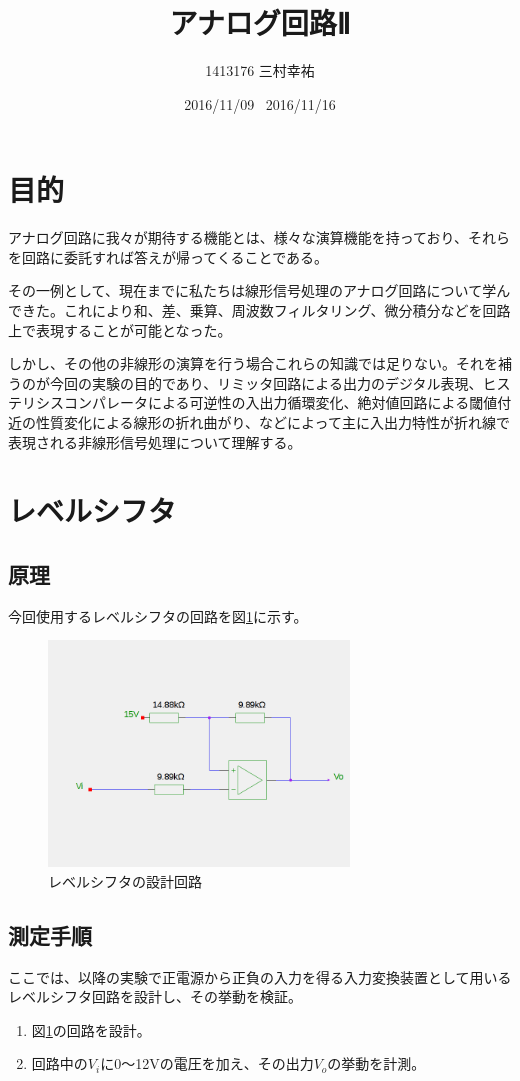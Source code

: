 \documentclass[11pt,a4j]{jsarticle}
\title{アナログ回路Ⅱ}
\author{1413176 三村幸祐}
\date{2016/11/09 \, 2016/11/16}
\begin{document}
  
 \tableofcontents \newpage
  
 \section{目的}
 アナログ回路に我々が期待する機能とは、様々な演算機能を持っており、それらを回路に委託すれば答えが帰ってくることである。
 
  その一例として、現在までに私たちは線形信号処理のアナログ回路について学んできた。これにより和、差、乗算、周波数フィルタリング、微分積分などを回路上で表現することが可能となった。
  
  しかし、その他の非線形の演算を行う場合これらの知識では足りない。それを補うのが今回の実験の目的であり、リミッタ回路による出力のデジタル表現、ヒステリシスコンパレータによる可逆性の入出力循環変化、絶対値回路による閾値付近の性質変化による線形の折れ曲がり、などによって主に入出力特性が折れ線で表現される非線形信号処理について理解する。
  
 \section{レベルシフタ}
  \subsection{原理}
   
   今回使用するレベルシフタの回路を図\ref{fig:levelshifter}に示す。
   
   \begin{figure}[htbp]
  \centering
  \includegraphics[width=8cm,clip]{levelshifter.png}
  \caption{レベルシフタの設計回路}
  \label{fig:levelshifter}
 \end{figure}%
   
  \subsection{測定手順}
   ここでは、以降の実験で正電源から正負の入力を得る入力変換装置として用いるレベルシフタ回路を設計し、その挙動を検証。
   \begin{enumerate}
   \item 図\ref{fig:levelshifter}の回路を設計。
   \item 回路中の$V_i$に0～12Vの電圧を加え、その出力$V_o$の挙動を計測。
   \end{enumerate}
   
\end{document}

